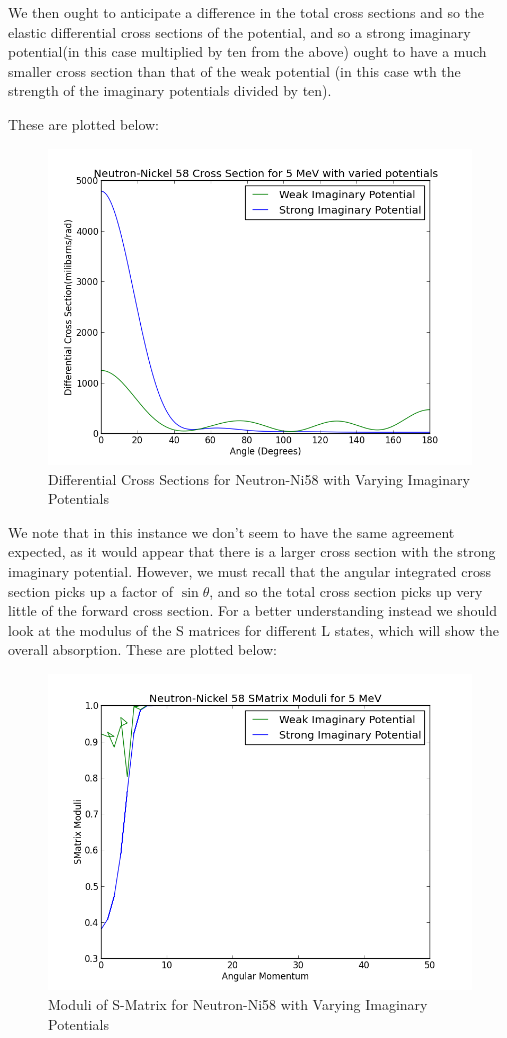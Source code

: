 \documentclass[paper=a4, fontsize=11pt]{scrartcl} %
\numberwithin{equation}{section} %
\numberwithin{figure}{section} %
\numberwithin{table}{section} %
\begin{document}
We then ought to anticipate a difference in the total cross sections and so the elastic differential cross sections of the potential, and so a strong imaginary potential(in this case multiplied by ten from the above) ought to have a much smaller cross section than that of the weak potential (in this case wth the strength of the imaginary potentials divided by ten).

These are plotted below:

 \begin{figure}[hbt!]
        \centering
\includegraphics[width=.6\textwidth]{Imcross}
        \caption{Differential Cross Sections for Neutron-Ni58 with Varying Imaginary Potentials}
\end{figure}
We note that in this instance we don't seem to have the same agreement expected, as it would appear that there is a larger cross section with the strong imaginary potential. However, we must recall that the angular integrated cross section picks up a factor of $\sin\theta$, and so the total cross section picks up very little of the forward cross section. For a better understanding instead we should look at the modulus of the S matrices for different L states, which will show the overall absorption. These are plotted below:\\


 \begin{figure}[hbt!]
        \centering
\includegraphics[width=.6\textwidth]{NeutronSms}

        \caption{Moduli of S-Matrix for Neutron-Ni58 with Varying Imaginary Potentials}
\end{figure}
\end{document}
